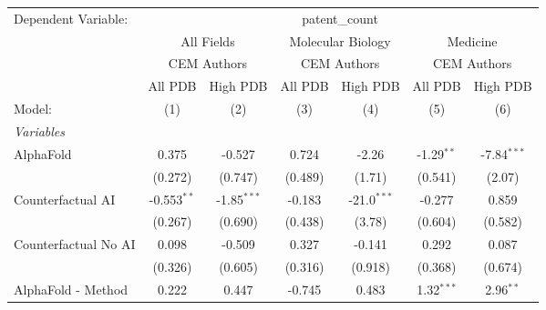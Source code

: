 \begingroup
\centering
\begin{tabular}{lcccccc}
   \tabularnewline \midrule \midrule
   Dependent Variable: & \multicolumn{6}{c}{patent\_count}\\
 & \multicolumn{2}{c}{All Fields} & \multicolumn{2}{c}{Molecular Biology} & \multicolumn{2}{c}{Medicine} \\
\cmidrule(lr){2-3} \cmidrule(lr){4-5} \cmidrule(lr){6-7}
 & \multicolumn{2}{c}{CEM Authors} & \multicolumn{2}{c}{CEM Authors} & \multicolumn{2}{c}{CEM Authors} \\
\cmidrule(lr){2-3} \cmidrule(lr){4-5} \cmidrule(lr){6-7}
 & \multicolumn{1}{c}{All PDB} & \multicolumn{1}{c}{High PDB} & \multicolumn{1}{c}{All PDB} & \multicolumn{1}{c}{High PDB} & \multicolumn{1}{c}{All PDB} & \multicolumn{1}{c}{High PDB} \\
\cmidrule(lr){2-2} \cmidrule(lr){3-3} \cmidrule(lr){4-4} \cmidrule(lr){5-5} \cmidrule(lr){6-6} \cmidrule(lr){7-7}
   Model:                                                     & (1)            & (2)           & (3)          & (4)           & (5)            & (6)\\  
   \midrule
   \emph{Variables}\\
   AlphaFold                                                  & 0.375          & -0.527        & 0.724        & -2.26         & -1.29$^{**}$   & -7.84$^{***}$\\   
                                                              & (0.272)        & (0.747)       & (0.489)      & (1.71)        & (0.541)        & (2.07)\\   
   Counterfactual AI                                          & -0.553$^{**}$  & -1.85$^{***}$ & -0.183       & -21.0$^{***}$ & -0.277         & 0.859\\   
                                                              & (0.267)        & (0.690)       & (0.438)      & (3.78)        & (0.604)        & (0.582)\\   
   Counterfactual No AI                                       & 0.098          & -0.509        & 0.327        & -0.141        & 0.292          & 0.087\\   
                                                              & (0.326)        & (0.605)       & (0.316)      & (0.918)       & (0.368)        & (0.674)\\   
   AlphaFold - Method                                         & 0.222          & 0.447         & -0.745       & 0.483         & 1.32$^{***}$   & 2.96$^{**}$\\   

\end{tabular}
